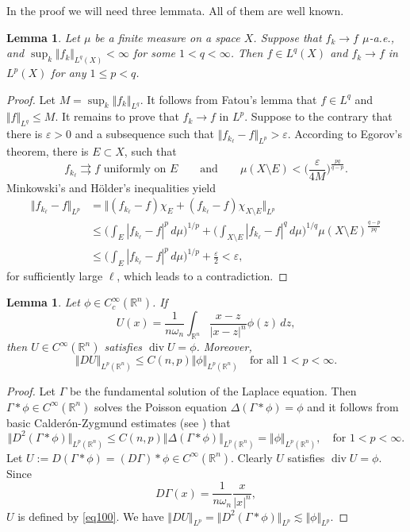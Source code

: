 \documentclass[intlimits,12pt,reqno]{amsart}
\newcommand{\R}{\mathbb R}
\newcommand{\eps}{\varepsilon}
\numberwithin{equation}{section}
\newtheorem{lemma}[theorem]{Lemma}
\theoremstyle{definition}
\begin{document}
In the proof we will need three lemmata. All of them are well known.
\begin{lemma}
\label{T84}
Let $\mu$ be a finite measure on a space $X$. Suppose that $f_k\to f$ $\mu$-a.e., and $\sup_k\Vert f_k\Vert_{L^q(X)}<\infty$ for some $1<q<\infty$. Then $f\in L^q(X)$ and $f_k\to f$ in $L^p(X)$ for any $1\leq p<q$.
\end{lemma}
\begin{proof}
Let $M=\sup_k\Vert f_k\Vert_{L^q}$. It follows from Fatou's lemma that $f\in L^q$ and $\Vert f\Vert_{L^q}\leq M$. It remains to prove that $f_k\to f$ in $L^p$. Suppose to the contrary that there is $\eps>0$ and a subsequence such that $\Vert f_{k_\ell}-f\Vert_{L^p}>\eps$. According to Egorov's theorem, there is $E\subset X$, such that
$$
f_{k_\ell}\rightrightarrows f \text{ uniformly on $E$}
\qquad
\text{and}
\qquad
\mu(X\setminus E)<\Big(\frac{\eps}{4M}\Big)^{\frac{pq}{q-p}}.
$$
Minkowski's and H\"older's inequalities yield
\[
\begin{split}
\Vert f_{k_\ell}-f \Vert_{L^p}
&=
\Vert (f_{k_\ell}-f)\chi_E + (f_{k_\ell}-f)\chi_{X\setminus E}\Vert_{L^p}\\
&\leq 
\Bigg(\int_E |f_{k_\ell}-f|^p\, d\mu\Bigg)^{1/p} +
\Bigg(\int_{X\setminus E} |f_{k_\ell}-f|^q\, d\mu\Bigg)^{1/q}\mu(X\setminus E)^{\frac{q-p}{pq}}\\
&\leq 
\Bigg(\int_E |f_{k_\ell}-f|^p\, d\mu\Bigg)^{1/p} +\frac{\eps}{2}<\eps,
\end{split}
\]
for sufficiently large $\ell$, which leads to a contradiction.
\end{proof}
\begin{lemma}
\label{T85}
Let $\phi\in C_c^\infty(\R^n)$. If
\begin{equation}
\label{eq100}
U(x)=\frac{1}{n\omega_n}\int_{\R^n}\frac{x-z}{|x-z|^n}\phi(z)\, dz,
\end{equation}
then $U\in C^\infty(\R^n)$ satisfies $\operatorname{div} U=\phi$. Moreover, 
\begin{equation}
\label{eq106}
\Vert DU\Vert_{L^p(\R^n)}\leq C(n,p)\Vert\phi\Vert_{L^p(\R^n)}
\quad
\text{for all $1<p<\infty$.}
\end{equation}
\end{lemma}
\begin{proof}
Let $\Gamma$ be the fundamental solution of the Laplace equation. Then $\Gamma*\phi\in C^\infty(\R^n)$ solves the Poisson equation 
$\Delta(\Gamma*\phi)=\phi$ and it follows from basic Calder\'on-Zygmund estimates (see \cite[Theorem~9.9]{GilbargT}) that
$$
\Vert D^2(\Gamma*\phi)\Vert_{L^p(\R^n)}\leq C(n,p)\Vert\Delta(\Gamma*\phi)\Vert_{L^p(\R^n)}=\Vert\phi\Vert_{L^p(\R^n)},
\quad
\text{for } 1<p<\infty.
$$
Let $U:=D(\Gamma*\phi)=(D\Gamma)*\phi\in C^\infty(\R^n)$. Clearly $U$ satisfies $\operatorname{div}U=\phi$.
Since
$$
D\Gamma(x)=\frac{1}{n\omega_n}\frac{x}{|x|^n},
$$
$U$ is defined by \eqref{eq100}. We have
$\Vert DU\Vert_{L^p}=\Vert D^2(\Gamma*\phi)\Vert_{L^p}\lesssim\Vert\phi\Vert_{L^p}$.
\end{proof}
\end{document}
